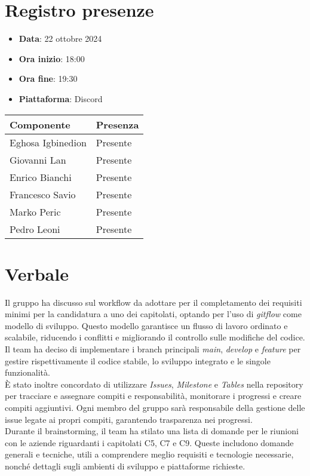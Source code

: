 \documentclass[a4paper, 12pt]{article}
\begin{document}
\section{Registro presenze}
   \begin{itemize}
        \item[] \textbf{Data}: 22 ottobre 2024
        \item[] \textbf{Ora inizio}: 18:00
        \item[] \textbf{Ora fine}: 19:30
        \item[] \textbf{Piattaforma}: Discord	
    \end{itemize}
\begin{table}[!h]
    \centering
    {\renewcommand{\arraystretch}{2}
    \begin{tabularx}{\textwidth}{| X | X |}
        \hline
            \textbf{\large Componente} & 
            \textbf{\large Presenza} \\ 
        \hline \hline 
            Eghosa Igbinedion &
            Presente \\ 
        \hline 
            Giovanni Lan &
            Presente \\ 
        \hline 
            Enrico Bianchi &
            Presente \\ 
        \hline 
            Francesco Savio &
            Presente \\ 
        \hline 
            Marko Peric &
            Presente \\ 
        \hline 
            Pedro Leoni &
            Presente \\ 
        \hline 
    \end{tabularx}}
\end{table}

\newpage

\section{Verbale}
Il gruppo ha discusso sul workflow da adottare per il completamento dei requisiti minimi per la candidatura a uno dei capitolati, optando per l’uso di \textit{gitflow} come modello di sviluppo. Questo modello garantisce un flusso di lavoro ordinato e scalabile, riducendo i conflitti e migliorando il controllo sulle modifiche del codice. Il team ha deciso di implementare i branch principali \textit{main}, \textit{develop} e \textit{feature} per gestire rispettivamente il codice stabile, lo sviluppo integrato e le singole funzionalità.
\\
È stato inoltre concordato di utilizzare \textit{Issues}, \textit{Milestone} e \textit{Tables} nella repository per tracciare e assegnare compiti e responsabilità, monitorare i progressi e creare compiti aggiuntivi. Ogni membro del gruppo sarà responsabile della gestione delle issue legate ai propri compiti, garantendo trasparenza nei progressi.
\\
Durante il brainstorming, il team ha stilato una lista di domande per le riunioni con le aziende riguardanti i capitolati C5, C7 e C9. Queste includono domande generali e tecniche, utili a comprendere meglio requisiti e tecnologie necessarie, nonché dettagli sugli ambienti di sviluppo e piattaforme richieste.
\end{document}
